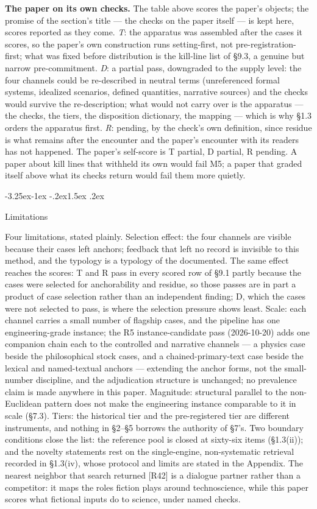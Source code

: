 \documentclass[11pt,a4paper]{article}
\makeatletter
\renewcommand\subsection{\@startsection{subsection}{2}{\z@}%
  {-3.25ex\@plus -1ex \@minus -.2ex}{1.5ex \@plus .2ex}%
  {\normalfont\large\bfseries\raggedright}}
\makeatother
\begin{document}
\textbf{The paper on its own checks.} The table above scores the paper's objects; the promise of the section's title — the checks on the paper itself — is kept here, scores reported as they come. \textit{T}: the apparatus was assembled after the cases it scores, so the paper's own construction runs setting-first, not pre-registration-first; what was fixed before distribution is the kill-line list of §9.3, a genuine but narrow pre-commitment. \textit{D}: a partial pass, downgraded to the supply level: the four channels could be re-described in neutral terms (unreferenced formal systems, idealized scenarios, defined quantities, narrative sources) and the checks would survive the re-description; what would not carry over is the apparatus — the checks, the tiers, the disposition dictionary, the mapping — which is why §1.3 orders the apparatus first. \textit{R}: pending, by the check's own definition, since residue is what remains after the encounter and the paper's encounter with its readers has not happened. The paper's self-score is T partial, D partial, R pending. A paper about kill lines that withheld its own would fail M5; a paper that graded itself above what its checks return would fail them more quietly.

\subsection{Limitations}

Four limitations, stated plainly. Selection effect: the four channels are visible because their cases left anchors; feedback that left no record is invisible to this method, and the typology is a typology of the documented. The same effect reaches the scores: T and R pass in every scored row of §9.1 partly because the cases were selected for anchorability and residue, so those passes are in part a product of case selection rather than an independent finding; D, which the cases were not selected to pass, is where the selection pressure shows least. Scale: each channel carries a small number of flagship cases, and the pipeline has one engineering-grade instance; the R5 instance-candidate pass (2026-10-20) adds one companion chain each to the controlled and narrative channels — a physics case beside the philosophical stock cases, and a chained-primary-text case beside the lexical and named-textual anchors — extending the anchor forms, not the small-number discipline, and the adjudication structure is unchanged; no prevalence claim is made anywhere in this paper. Magnitude: structural parallel to the non-Euclidean pattern does not make the engineering instance comparable to it in scale (§7.3). Tiers: the historical tier and the pre-registered tier are different instruments, and nothing in §2–§5 borrows the authority of §7's. Two boundary conditions close the list: the reference pool is closed at sixty-six items (§1.3(ii)); and the novelty statements rest on the single-engine, non-systematic retrieval recorded in §1.3(iv), whose protocol and limits are stated in the Appendix. The nearest neighbor that search returned [R42] is a dialogue partner rather than a competitor: it maps the roles fiction plays around technoscience, while this paper scores what fictional inputs do to science, under named checks.
\end{document}
